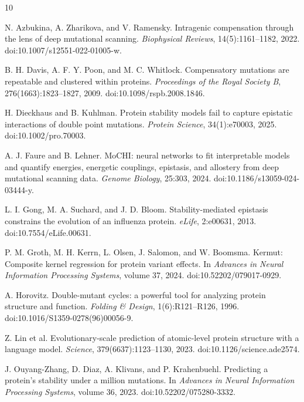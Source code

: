 \documentclass{llncs}
\begin{document}
\clearpage
\begin{thebibliography}{10}

N. Azbukina, A. Zharikova, and V. Ramensky.
\newblock Intragenic compensation through the lens of deep mutational scanning.
\newblock \emph{Biophysical Reviews}, 14(5):1161--1182, 2022.
\newblock doi:10.1007/s12551-022-01005-w.

B. H. Davis, A. F. Y. Poon, and M. C. Whitlock.
\newblock Compensatory mutations are repeatable and clustered within proteins.
\newblock \emph{Proceedings of the Royal Society B}, 276(1663):1823--1827, 2009.
\newblock doi:10.1098/rspb.2008.1846.

H. Dieckhaus and B. Kuhlman.
\newblock Protein stability models fail to capture epistatic interactions of double point mutations.
\newblock \emph{Protein Science}, 34(1):e70003, 2025.
\newblock doi:10.1002/pro.70003.

A. J. Faure and B. Lehner.
\newblock MoCHI: neural networks to fit interpretable models and quantify energies, energetic couplings, epistasis, and allostery from deep mutational scanning data.
\newblock \emph{Genome Biology}, 25:303, 2024.
\newblock doi:10.1186/s13059-024-03444-y.

L. I. Gong, M. A. Suchard, and J. D. Bloom.
\newblock Stability-mediated epistasis constrains the evolution of an influenza protein.
\newblock \emph{eLife}, 2:e00631, 2013.
\newblock doi:10.7554/eLife.00631.

P. M. Groth, M. H. Kerrn, L. Olsen, J. Salomon, and W. Boomsma.
\newblock Kermut: Composite kernel regression for protein variant effects.
\newblock In \emph{Advances in Neural Information Processing Systems}, volume 37, 2024.
\newblock doi:10.52202/079017-0929.

A. Horovitz.
\newblock Double-mutant cycles: a powerful tool for analyzing protein structure and function.
\newblock \emph{Folding \& Design}, 1(6):R121--R126, 1996.
\newblock doi:10.1016/S1359-0278(96)00056-9.

Z. Lin et al.
\newblock Evolutionary-scale prediction of atomic-level protein structure with a language model.
\newblock \emph{Science}, 379(6637):1123--1130, 2023.
\newblock doi:10.1126/science.ade2574.

J. Ouyang-Zhang, D. Diaz, A. Klivans, and P. Krahenbuehl.
\newblock Predicting a protein's stability under a million mutations.
\newblock In \emph{Advances in Neural Information Processing Systems}, volume 36, 2023.
\newblock doi:10.52202/075280-3332.


\end{thebibliography}
\end{document}
